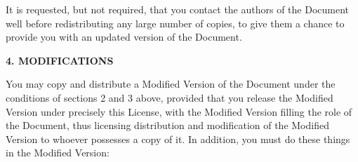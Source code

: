 \documentclass{report}
\begin{document}
It is requested, but not required, that you contact the authors of the
Document well before redistributing any large number of copies, to give
them a chance to provide you with an updated version of the Document.


\begin{center}
{\Large\bf 4. MODIFICATIONS}
\end{center}

You may copy and distribute a Modified Version of the Document under
the conditions of sections 2 and 3 above, provided that you release
the Modified Version under precisely this License, with the Modified
Version filling the role of the Document, thus licensing distribution
and modification of the Modified Version to whoever possesses a copy
of it.  In addition, you must do these things in the Modified Version:
\end{document}
